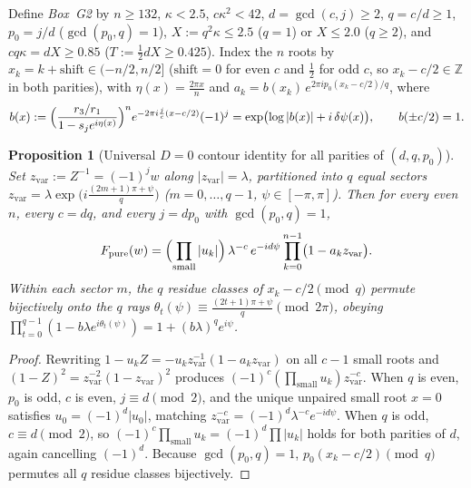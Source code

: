 \documentclass[10pt]{article}
\numberwithin{equation}{section}
\theoremstyle{plain}
\newtheorem{proposition}[theorem]{Proposition}
\theoremstyle{definition}
\newcommand{\Z}{\mathbb{Z}}
\newcommand{\1}{\mathbf{1}}
\begin{document}
Define \emph{Box~G2} by $n \ge 132$, $\kappa < 2.5$, $c\kappa^2 < 42$, $d = \gcd(c, j) \ge 2$, $q = c/d \ge 1$, $p_0 = j/d$ ($\gcd(p_0, q) = 1$), $X := q^2\kappa \le 2.5$ ($q = 1$) or $X \le 2.0$ ($q \ge 2$), and $c q \kappa = d X \ge 0.85$ ($T := \frac{1}{2} d X \ge 0.425$). Index the $n$ roots by $x_k = k + \mathrm{shift} \in (-n/2, n/2]$ ($\mathrm{shift} = 0$ for even $c$ and $\frac{1}{2}$ for odd $c$, so $x_k - c/2 \in \Z$ in both parities), with $\eta(x) = \frac{2\pi x}{n}$ and $a_k = b(x_k)\, e^{2\pi i p_0 (x_k - c/2)/q}$, where
\begin{equation}\label{eq:bx}
b(x) := \Bigl(\frac{r_3/r_1}{1 - s_j e^{i\eta(x)}}\Bigr)^n e^{-2\pi i \frac{j}{c}(x - c/2)}(-1)^j = \exp\bigl(\log|b(x)| + i\,\delta\psi(x)\bigr), \qquad b(\pm c/2) = 1.
\end{equation}

\begin{proposition}[Universal $D = 0$ contour identity for all parities of $(d, q, p_0)$]\label{prop:G2-contour}
Set $z_{\mathrm{var}} := Z^{-1} = (-1)^j w$ along $|z_{\mathrm{var}}| = \lambda$, partitioned into $q$ equal sectors $z_{\mathrm{var}} = \lambda \exp\bigl(i\frac{(2m+1)\pi + \psi}{q}\bigr)$ ($m = 0, \dots, q - 1$, $\psi \in [-\pi, \pi]$). Then for every even $n$, every $c = dq$, and every $j = d p_0$ with $\gcd(p_0, q) = 1$,
\[
F_{\mathrm{pure}}(w) = \Bigl(\prod_{\mathrm{small}}|u_k|\Bigr)\,\lambda^{-c}\, e^{-i d\psi} \prod_{k=0}^{n-1}\bigl(1 - a_k z_{\mathrm{var}}\bigr).
\]
Within each sector $m$, the $q$ residue classes of $x_k - c/2 \pmod{q}$ permute bijectively onto the $q$ rays $\theta_t(\psi) \equiv \frac{(2t+1)\pi + \psi}{q} \pmod{2\pi}$, obeying $\prod_{t=0}^{q-1}(1 - b\lambda e^{i\theta_t(\psi)}) = 1 + (b\lambda)^q e^{i\psi}$.
\end{proposition}

\begin{proof}
Rewriting $1 - u_k Z = -u_k z_{\mathrm{var}}^{-1}(1 - a_k z_{\mathrm{var}})$ on all $c - 1$ small roots and $(1 - Z)^2 = z_{\mathrm{var}}^{-2}(1 - z_{\mathrm{var}})^2$ produces $(-1)^c(\prod_{\mathrm{small}} u_k) z_{\mathrm{var}}^{-c}$. When $q$ is even, $p_0$ is odd, $c$ is even, $j \equiv d \pmod{2}$, and the unique unpaired small root $x = 0$ satisfies $u_0 = (-1)^d|u_0|$, matching $z_{\mathrm{var}}^{-c} = (-1)^d \lambda^{-c} e^{-id\psi}$. When $q$ is odd, $c \equiv d \pmod{2}$, so $(-1)^c\prod_{\mathrm{small}} u_k = (-1)^d \prod |u_k|$ holds for both parities of $d$, again cancelling $(-1)^d$. Because $\gcd(p_0, q) = 1$, $p_0(x_k - c/2) \pmod{q}$ permutes all $q$ residue classes bijectively.
\end{proof}
\end{document}
